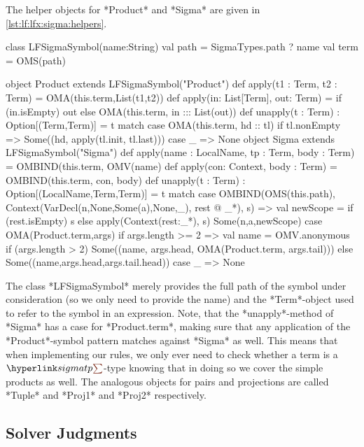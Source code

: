 \begin{example}
 The helper objects for *Product* and *Sigma* are given in \autoref{lst:lf:lfx:sigma:helpers}.

\begin{scalacode}[caption=Helper Objects\protect\footnotemark,label=lst:lf:lfx:sigma:helpers,emph={Product,Sigma,LFSigmaSymbol,SigmaTypes}]
class LFSigmaSymbol(name:String) {
  val path = SigmaTypes.path ? name
  val term = OMS(path)
}

object Product extends LFSigmaSymbol("Product") {
  def apply(t1 : Term, t2 : Term) = OMA(this.term,List(t1,t2))
  def apply(in: List[Term], out: Term) = if (in.isEmpty) out 
  	else OMA(this.term, in ::: List(out))
  def unapply(t : Term) : Option[(Term,Term)] = t match {
    case OMA(this.term, hd :: tl) if tl.nonEmpty => 
    	Some((hd, apply(tl.init, tl.last)))
    case _ => None
  }
}
object Sigma extends LFSigmaSymbol("Sigma") {
  def apply(name : LocalName, tp : Term, body : Term) = 
  	OMBIND(this.term, OMV(name) %
  def apply(con: Context, body : Term) = OMBIND(this.term, con, body)
  def unapply(t : Term) : Option[(LocalName,Term,Term)] = t match {
    case OMBIND(OMS(this.path), 
    	Context(VarDecl(n,None,Some(a),None,_), rest @ _*), s) =>
      val newScope = if (rest.isEmpty) s
      	else apply(Context(rest:_*), s)
      Some(n,a,newScope)
    case OMA(Product.term,args) if args.length >= 2 =>
      val name = OMV.anonymous
      if (args.length > 2)
        Some((name, args.head, OMA(Product.term, args.tail)))
      else
        Some((name,args.head,args.tail.head))
    case _ => None
  }
}
\end{scalacode}

The class *LFSigmaSymbol* merely provides the full path of the symbol under consideration (so we only need to provide the name) and the *Term*-object used to refer to the symbol in an expression. Note, that the *unapply*-method of *Sigma* has a case for *Product.term*, making sure that any application of the *Product*-symbol pattern matches against *Sigma* as well. This means that when implementing our rules, we only ever need to check whether a term is a $\sigmasym$-type knowing that in doing so we cover the simple products as well. The analogous objects for pairs and projections are called *Tuple* and *Proj1* and *Proj2* respectively.
\end{example}

\subsection{Solver Judgments}\label{sec:lf:lfx:sigma:judg}

